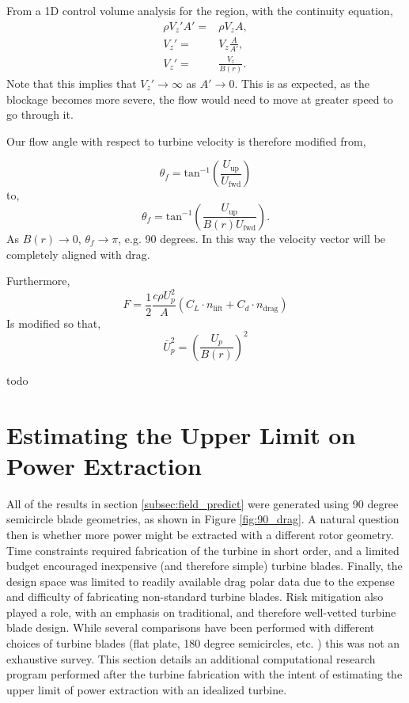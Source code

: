 From a 1D control volume analysis for the region, with the continuity
equation, 
\begin{eqnarray}
 \rho V_z' A' =& \rho V_z A,\\
 V_z' =& V_z \frac{A}{A'}, \\
 V_z' =& \frac{V_z}{B(r)}.
\end{eqnarray}
Note that this implies that $V_z' \rightarrow \infty$ as $A' \rightarrow
0$. This is as expected, as the blockage becomes more severe, the flow
would need to move at greater speed to go through it. 

Our flow angle with respect to turbine velocity is therefore modified
from,

\begin{equation}
 \theta_f = \text{tan}^{-1}(\frac{U_{\text{up}}}{U_{\text{fwd}}})
\end{equation}
to,
\begin{equation}
 \theta_f = \text{tan}^{-1}(\frac{U_{\text{up}}}{B(r) U_{\text{fwd}}}). 
\end{equation}
As $B(r) \rightarrow 0$, $\theta_f \rightarrow \pi$, e.g. 90 degrees. In
this way the velocity vector will be completely aligned with drag. 

Furthermore, 
\begin{equation}
 F = \frac{1}{2}\frac{c \rho U_p^2}{A}(C_L \cdot n_{\text{lift}} + C_d \cdot n_{\text{drag}})
\end{equation}
Is modified so that, 
\begin{equation}
 \bar U_p^{2} = \left(\frac{U_p}{B(r)}\right)^2
\end{equation}

todo

\section{Estimating the Upper Limit on Power Extraction}
\label{sec:peak_estimate}

All of the results in section \ref{subsec:field_predict} were generated
using 90 degree semicircle blade geometries, as shown in Figure
\ref{fig:90_drag}. A natural question then is whether more power might
be extracted with a different rotor geometry. Time constraints required
fabrication of the turbine in short 
order, and a limited budget encouraged inexpensive (and therefore
simple) turbine blades. Finally, the design space was limited to 
readily available drag polar data due to the expense and difficulty of
fabricating non-standard turbine blades. Risk mitigation also played a
role, with an emphasis on traditional, and therefore well-vetted turbine
blade design. While several comparisons have been performed with
different choices of turbine blades (flat plate, 180 degree semicircles,
etc. ) this was not an exhaustive survey. This section details an
additional computational research program performed after the turbine
fabrication with the intent of estimating the upper limit of power
extraction with an idealized turbine. 

